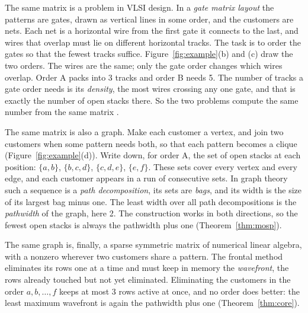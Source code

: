 The same matrix is a problem in VLSI design. In a \emph{gate matrix layout}
the patterns are gates, drawn as vertical lines in some order, and the
customers are nets. Each net is a horizontal wire from the first gate it
connects to the last, and wires that overlap must lie on different horizontal
tracks. The task is to order the gates so that the fewest tracks suffice.
Figure~\ref{fig:example}(b) and (c) draw the two orders. The wires are the same;
only the gate order changes which wires overlap. Order A packs into 3 tracks
and order B needs 5. The number of tracks a gate order needs is its
\emph{density}, the most wires crossing any one gate, and that is exactly the
number of open stacks there. So the two problems compute the same number from
the same matrix \citep[Proposition~2]{LY2002}.

The same matrix is also a graph. Make each customer a vertex, and join two
customers when some pattern needs both, so that each pattern becomes a clique
(Figure~\ref{fig:example}(d)). Write down, for order A, the set of open stacks
at each position: $\{a,b\}$, $\{b,c,d\}$, $\{c,d,e\}$, $\{e,f\}$. These sets
cover every vertex and every edge, and each customer appears in a run of
consecutive sets. In graph theory such a sequence is a \emph{path
decomposition}, its sets are \emph{bags}, and its width is the size of its
largest bag minus one. The least width over all path decompositions is the
\emph{pathwidth} of the graph, here 2. The construction works in both
directions, so the fewest open stacks is always the pathwidth plus one
(Theorem~\ref{thm:mosp}).

The same graph is, finally, a sparse symmetric matrix of numerical linear
algebra, with a nonzero wherever two customers share a pattern. The frontal
method eliminates its rows one at a time and must keep in memory the
\emph{wavefront}, the rows already touched but not yet eliminated. Eliminating
the customers in the order $a,b,\dots,f$ keeps at most 3 rows active at once,
and no order does better: the least maximum wavefront is again the pathwidth
plus one (Theorem~\ref{thm:core}).

